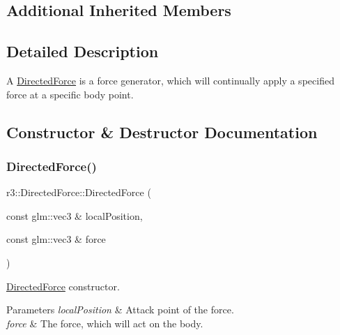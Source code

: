\subsection*{Additional Inherited Members}


\subsection{Detailed Description}
A \mbox{\hyperlink{classr3_1_1_directed_force}{Directed\+Force}} is a force generator, which will continually apply a specified force at a specific body point. 

\subsection{Constructor \& Destructor Documentation}
\mbox{\label{classr3_1_1_directed_force_a01b61a6ebe0c54f92952d69e3d0cf09e}} 
\subsubsection{\texorpdfstring{Directed\+Force()}{DirectedForce()}}
{\footnotesize\ttfamily r3\+::\+Directed\+Force\+::\+Directed\+Force (\begin{DoxyParamCaption}\item[{const glm\+::vec3 \&}]{local\+Position,  }\item[{const glm\+::vec3 \&}]{force }\end{DoxyParamCaption})}



\mbox{\hyperlink{classr3_1_1_directed_force}{Directed\+Force}} constructor. 


\begin{DoxyParams}{Parameters}
{\em local\+Position} & Attack point of the force. \\
\hline
{\em force} & The force, which will act on the body. \\
\hline
\end{DoxyParams}
\mbox{\label{classr3_1_1_directed_force_a98aa1b750a187ba18a6fce0c530e397f}} 
